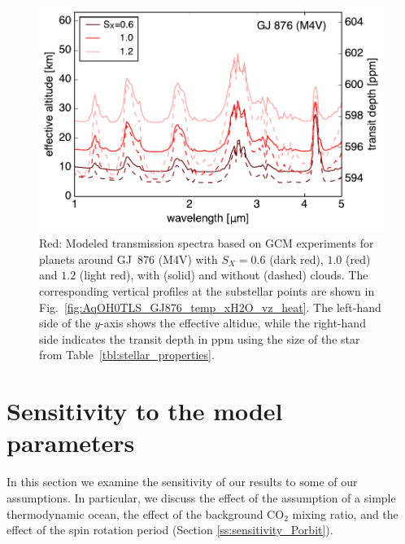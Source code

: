 \documentclass[11pt,numberedappendix,twocolappendix,]{emulateapj}
\newcommand{\dsa}[1]{{\color{blue}#1}}
\begin{document}
\begin{figure}[!h]
    \begin{center}
    \includegraphics[width=\hsize]{fig/transit_GJ876.pdf}
    \end{center}
\caption{Red: Modeled transmission spectra based on GCM experiments for planets around GJ~876 (M4V) with $S_X=0.6$ (dark red), $1.0$ (red) and $1.2$ (light red), with (solid) and without (dashed) clouds. The corresponding vertical profiles at the \dsa{substellar} points are shown in Fig.~\ref{fig:AqOH0TLS_GJ876_temp_xH2O_vz_heat}. The left-hand side of the $y$-axis shows the effective altidue, while the right-hand side indicates the transit depth in ppm \dsa{using the size of the star from Table~\ref{tbl:stellar_properties}.}}
\label{fig:transmission}
\end{figure}


\section{Sensitivity to the model parameters}
\label{s:sensitivity}

In this section we examine the sensitivity of our results to \dsa{some of our assumptions}. 
In particular, we discuss the effect of the assumption of \dsa{a} simple thermodynamic ocean, the effect of the background CO$_2$ mixing ratio, and the effect of \dsa{the} spin rotation period (Section \ref{ss:sensitivity_Porbit}). 



\end{document}
